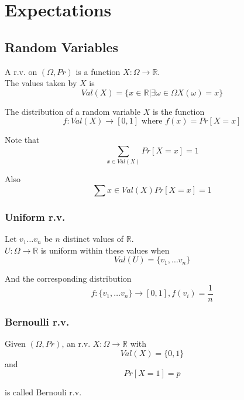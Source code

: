 \chapter{Expectations}

\section{Random Variables}
\begin{framed}
   A r.v. on $(\Omega, Pr)$ is a function $X : \Omega \rightarrow \mathbb{R}$. \\

   The values taken by $X$ is
   \[
     Val(X) = \{ x \in \mathbb{R} | \exists \omega \in \Omega X(\omega) = x \} 
   \] 

   The distribution of a random variable $X$ is the function
   \[
      f: Val (X) \rightarrow [0, 1] \text{ where } f(x) = Pr[X = x]
   \] 

   Note that
   \[
      \sum_{x \in Val(X)} Pr[X = x] = 1
   \] 

   Also
   \[
      \sum{x \in Val(X)} Pr[X = x] = 1
   \] 
\end{framed}

\subsection{Uniform r.v. }
\begin{framed}
   Let $v_1 \hdots v_n$ be  $n$ distinct values of $\mathbb{R}$. \\

   $U : \Omega \rightarrow \mathbb{R}$ is uniform within these values when
   \[
     Val(U ) = \{ v_1, \hdots v_n \} 
   \] 

   And the corresponding distribution
   \[
      f : \{ v_1, \hdots v_n \}  \rightarrow [0, 1], f(v_i) =  \frac{1}{n}
   \] 
\end{framed}

\subsection{Bernoulli r.v.}
\begin{framed}
   Given $(\Omega, Pr)$, an r.v. $X: \Omega \rightarrow \mathbb{R}$ with
   \[
     Val(X) = \{ 0, 1 \} 
   \] 
   and 
   \[
      Pr[X = 1] = p
   \] 

   is called Bernouli r.v.

   
  
\end{framed}


